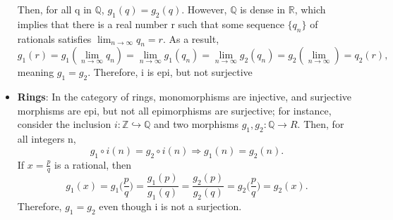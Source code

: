 \documentclass[../category_theory.tex]{subfiles}
\begin{document}
\begin{example}
\begin{itemize}
\[		      \]
		      Then, for all q in \(\mathbb{Q}\), \(g_1(q)=g_2(q)\). However, \(\mathbb{Q}\) is dense in \(\mathbb{R}\), which implies that there is a real number r such that some sequence \(\{q_{n}\}\) of rationals satisfies \(\lim_{n\to \infty}q_{n}=r\). As a result,
		      \[
			      g_1(r)=g_1(\lim_{n\to \infty}q_{n})=\lim_{n\to \infty}g_1(q_{n})=\lim_{n\to \infty}g_2(q_{n})=g_2(\lim_{n\to \infty})=q_2(r),
		      \]
		      meaning \(g_1=g_2\). Therefore, i is epi, but not surjective
		\item \textbf{Rings}: In the category of rings, monomorphisms are injective, and surjective morphisms are epi, but not all epimorphisms are surjective; for instance, consider the inclusion \(i:\mathbb{Z}\hookrightarrow \mathbb{Q}\) and two morphisms \(g_1, g_2:\mathbb{Q}\rightarrow R\). Then, for all integers n,
		      \[
			      g_1\circ i(n)=g_2\circ i(n) \Rightarrow g_1(n)=g_2(n).
		      \]
		      If \(x = \frac{p}{q}\) is a rational, then
		      \[
			      g_1(x)=g_1 \biggl(\frac{p}{q}\biggr) = \frac{g_1(p)}{g_1(q)} = \frac{g_2(p)}{g_2(q)}=g_2 \biggl(\frac{p}{q}\biggr) = g_2(x).
		      \]
		      Therefore, \(g_1=g_2\) even though i is not a surjection.
	\end{itemize}
\end{example}
\end{document}
